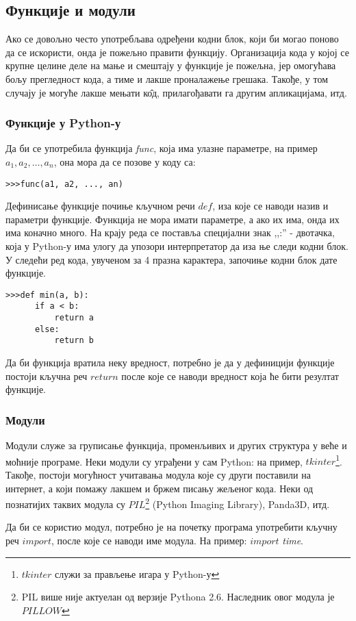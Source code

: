 \subsection{Функције и модули}

Ако се довољно често употребљава одређени кодни блок, који би могао поново да се искористи, онда је пожељно правити функцију. Организација кода у којој се крупне целине деле на мање и смештају у функције је пожељна, јер омогућава бољу прегледност кода, а тиме и лакше проналажење грешака. Такође, у том случају је могуће лакше мењати к\^{о}д, прилагођавати га другим апликацијама, итд.

\subsubsection{Функције у Python-у}

Да би се употребила функција \emph{func}, која има улазне параметре, на пример $a_{1}, a_{2},\dots, a_{n}$, она мора да се позове у коду са:

\begin{lstlisting}
>>>func(a1, a2, ..., an)
\end{lstlisting}

Дефинисање функције почиње кључном речи $def$, иза које се наводи назив и параметри функције. Функција не мора имати параметре, а ако их има, онда их има коначно много. На крају реда се поставља специјални знак ,,:'' - двотачка, која у Python-у има улогу да упозори интерпретатор да иза ње следи кодни блок. У следећи ред кода, увученом за 4 празна карактера, започиње кодни блок дате функције.

\begin{lstlisting}[caption = Дефинисање функције, label = func]
>>>def min(a, b):
      if a < b:
          return a
      else:
          return b
\end{lstlisting}

Да би функција вратила неку вредност, потребно је да у дефиницији функције постоји кључна реч $return$ после које се наводи вредност која ће бити резултат функције.

\subsubsection{Модули}

Модули служе за груписање функција, променљивих и других структура у веће и моћније програме. Неки модули су уграђени у сам Python: на пример, $tkinter$\footnote{$tkinter$ служи за прављење игара у Python-у}. Такође, постоји могућност учитавања модула које су други поставили на интернет, а који помажу лакшем и бржем писању жељеног кода. Неки од познатијих таквих модула су $PIL$\footnote{PIL више није актуелан од верзије Pythona 2.6. Наследник овог модула је $PILLOW$}  (Python Imaging Library), Panda3D, итд.

Да би се користио модул, потребно је на почетку програма употребити кључну реч $import$, после које се наводи име модула. На пример: $import$ \emph{time}.

